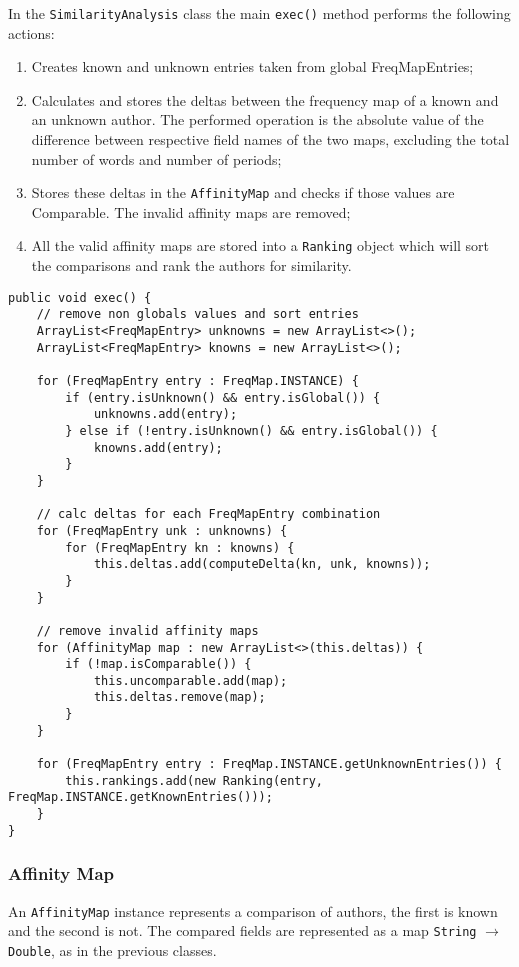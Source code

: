 \documentclass[a4paper,11pt, twoside]{article}
\begin{document}
		\noindent
		In the \lstinline|SimilarityAnalysis| class the main \lstinline|exec()| method performs the following actions:
		\begin{enumerate}
			\item Creates known and unknown entries taken from global FreqMapEntries;
			\item Calculates and stores the deltas between the frequency map of a known and an unknown author. The performed operation is the absolute value of the difference between respective field names of the two maps, excluding the total number of words and number of periods;
			\item Stores these deltas in the \lstinline|AffinityMap| and checks if those values are Comparable. The invalid affinity maps are removed;
			\item All the valid affinity maps are stored into a \lstinline|Ranking| object which will sort the comparisons and rank the authors for similarity.
		\end{enumerate}
		\begin{lstlisting}[firstnumber=35,caption={SimilarityAnalysis exec method}, captionpos=b, label={lst:execmethod}]
public void exec() {
	// remove non globals values and sort entries
	ArrayList<FreqMapEntry> unknowns = new ArrayList<>();
	ArrayList<FreqMapEntry> knowns = new ArrayList<>();

	for (FreqMapEntry entry : FreqMap.INSTANCE) {
		if (entry.isUnknown() && entry.isGlobal()) {
			unknowns.add(entry);
		} else if (!entry.isUnknown() && entry.isGlobal()) {
			knowns.add(entry);
		}
	}

	// calc deltas for each FreqMapEntry combination
	for (FreqMapEntry unk : unknowns) {
		for (FreqMapEntry kn : knowns) {
			this.deltas.add(computeDelta(kn, unk, knowns));
		}
	}

	// remove invalid affinity maps
	for (AffinityMap map : new ArrayList<>(this.deltas)) {
		if (!map.isComparable()) {
			this.uncomparable.add(map);
			this.deltas.remove(map);
		}
	}

	for (FreqMapEntry entry : FreqMap.INSTANCE.getUnknownEntries()) {
		this.rankings.add(new Ranking(entry, FreqMap.INSTANCE.getKnownEntries()));
	}
}
		\end{lstlisting}

		\subsubsection{Affinity Map}
		\noindent
		An \lstinline|AffinityMap| instance represents a comparison of authors, the first is known and the second is not. The compared fields are represented as a map \lstinline|String| $\to$ \lstinline|Double|, as in the previous classes. 
		
\end{document}

